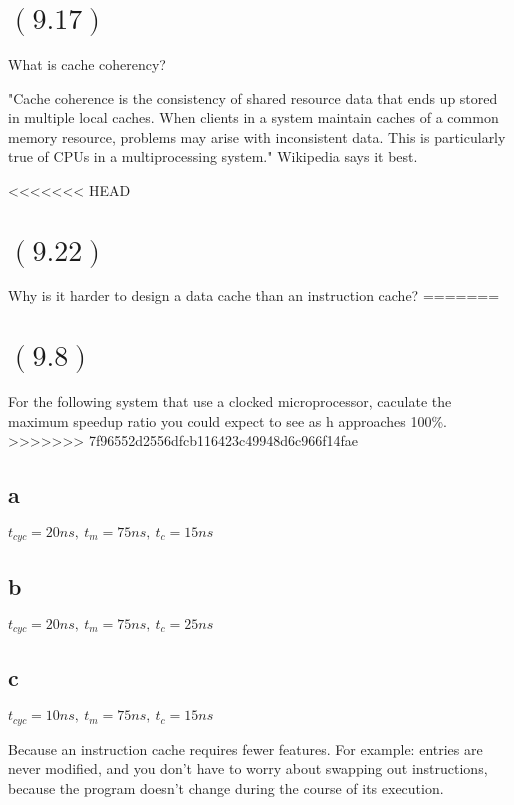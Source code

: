 \documentclass[letterpaper,12pt,titlepage]{article}
\begin{document}
\section*{$(9.17)$} What is cache coherency?
\begin{mdframed}[style=MyFrame]
"Cache coherence is the consistency of shared resource data that ends up stored in multiple local caches. When clients in a system maintain caches of a common memory resource, problems may arise with inconsistent data. This is particularly true of CPUs in a multiprocessing system." Wikipedia says it best. 
\end{mdframed}

<<<<<<< HEAD
\section*{$(9.22)$} Why is it harder to design a data cache than an instruction cache?
=======
\section*{$(9.8)$} For the following system that use a clocked microprocessor, caculate the maximum speedup ratio you could expect to see as h approaches 100\%.
>>>>>>> 7f96552d2556dfcb116423c49948d6c966f14fae

\subsection*{a} $t_{cyc}=20ns,~t_m=75ns,~t_c=15ns$
\begin{mdframed}[style=MyFrame]
\end{mdframed}
\subsection*{b} $t_{cyc}=20ns,~t_m=75ns,~t_c=25ns$
\begin{mdframed}[style=MyFrame]
\end{mdframed}
\subsection*{c} $t_{cyc}=10ns,~t_m=75ns,~t_c=15ns$
\begin{mdframed}[style=MyFrame]
Because an instruction cache requires fewer features. For example: entries are never modified, and you don't have to worry about swapping out instructions, because the program doesn't change during the course of its execution.
\end{mdframed}
\end{document}
